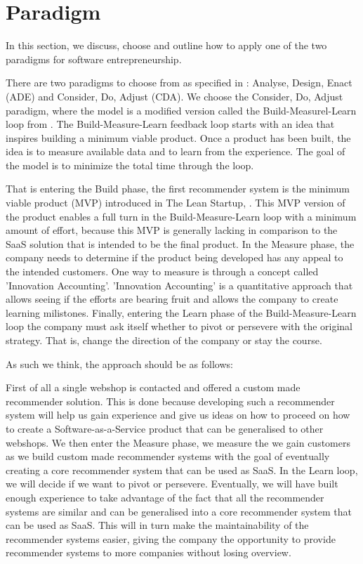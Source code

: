 \section{Paradigm}
In this section, we discuss, choose and outline how to apply one of the two paradigms for software entrepreneurship.

There are two paradigms to choose from as specified in \citet[pg. 30-32]{book:jrose}: Analyse, Design, Enact (ADE) and Consider, Do, Adjust (CDA). 
We choose the Consider, Do, Adjust paradigm, where the model is a modified version called the Build-Measurel-Learn loop from \citet[pg. 81-]{ries2011lean}. 
The Build-Measure-Learn feedback loop starts with an idea that inspires building a minimum viable product.
Once a product has been built, the idea is to measure available data and to learn from the experience.
The goal of the model is to minimize the total time through the loop. 

That is entering the Build phase, the first recommender system is the minimum viable product (MVP) introduced in The Lean Startup, \citep[pg. 82]{ries2011lean}.
This MVP version of the product enables a full turn in the Build-Measure-Learn loop with a minimum amount of effort, because this MVP is generally lacking in comparison to the SaaS solution that is intended to be the final product.
In the Measure phase, the company needs to determine if the product being developed has any appeal to the intended customers. 
One way to measure is through a concept called 'Innovation Accounting'\citep[pg. 82]{ries2011lean}.
'Innovation Accounting' is a quantitative approach that allows seeing if the efforts are bearing fruit and allows the company to create learning milistones. 
Finally, entering the Learn phase of the Build-Measure-Learn loop the company must ask itself whether to pivot or persevere with the original strategy.
That is, change the direction of the company or stay the course. 

As such we think, the approach should be as follows:

First of all a single webshop is contacted and offered a custom made recommender solution. 
This is done because developing such a recommender system will help us gain experience and give us ideas on how to proceed on how to create a Software-as-a-Service product that can be generalised to other webshops.
We then enter the Measure phase, we measure the we gain customers as we build custom made recommender systems with the goal of eventually creating a core recommender system that can be used as SaaS.
In the Learn loop, we will decide if we want to pivot or persevere. Eventually, we will have built enough experience to take advantage of the fact that all the recommender systems are similar and can be generalised into a core recommender system that can be used as SaaS.
This will in turn make the maintainability of the recommender systems easier, giving the company the opportunity to provide recommender systems to more companies without losing overview. 

